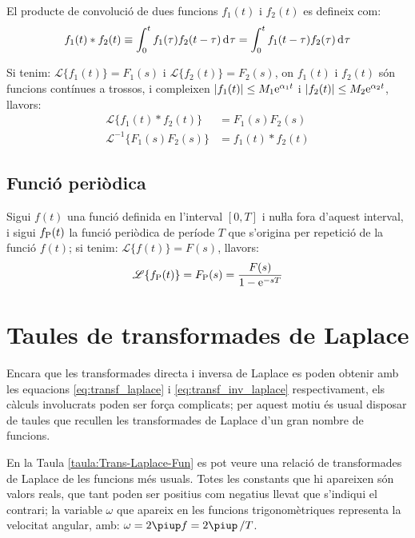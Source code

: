 El producte de convolució de dues funcions $f_1(t)$ i $f_2(t)$ es
defineix com:
\begin{equation}
    f_1(t) * f_2(t) \equiv \int_0^t f_1(\tau) f_2(t-\tau) \diff\tau =
    \int_0^t f_1(t-\tau) f_2(\tau) \diff\tau
\end{equation}

Si tenim: $\mathscr{L} \{f_1(t) \} = F_1(s)$ i $\mathscr{L}
\{f_2(t) \} = F_2(s)$, on $f_1(t)$ i $f_2(t)$ són funcions
contínues a trossos, i compleixen $|f_1(t)|\leq M_1\mathrm{e}^{\alpha_1 t}$
i $|f_2(t)|\leq M_2\mathrm{e}^{\alpha_2 t}$, llavors:
\begin{align}
    \mathscr{L} \{ f_1(t) * f_2(t) \} &= F_1(s) F_2(s)\\
    \mathscr{L}^{-1} \{ F_1(s) F_2(s) \} &= f_1(t) * f_2(t)
\end{align}

\subsection{Funció periòdica}

Sigui $f(t)$ una funció definida en l'interval $[0,T]$ i nuŀla
fora d'aquest interval, i sigui $f_\mathrm{P}(t)$ la funció periòdica de
període $T$ que s'origina per repetició de la funció $f(t)$; si
tenim: $\mathscr{L} \{f(t) \} = F(s)$, llavors:
\begin{equation}
   \mathscr{L} \{f_\mathrm{P}(t) \} = F_\mathrm{P}(s) = \frac{F(s)}{1-\mathrm{e}^{-sT}}
\end{equation}

\section{Taules de transformades de Laplace}

Encara que les transformades directa i inversa de Laplace es poden
obtenir amb les equacions \eqref{eq:transf_laplace} i
\eqref{eq:transf_inv_laplace} respectivament, els càlculs
involucrats poden ser força complicats; per aquest motiu és usual
disposar de taules que recullen les transformades de Laplace d'un
gran nombre de funcions.

En la Taula \vref{taula:Trans-Laplace-Fun} es pot veure una relació de
transformades de Laplace de les funcions més usuals. Totes les
constants que hi apareixen són valors reals, que tant poden ser
positius com negatius llevat que s'indiqui el contrari; la variable
$\omega$ que apareix en les funcions trigonomètriques representa la
velocitat angular, amb: $\omega=2\piup f=2\piup\,/T$.

